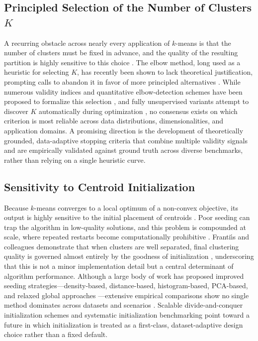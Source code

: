 \subsection{Principled Selection of the Number of Clusters $K$}
A recurring obstacle across nearly every application of $k$-means is that the number of clusters must be fixed in advance, and the quality of the resulting partition is highly sensitive to this choice \cite{yuan2019research,chong2021means,gowsic2024enhanced,ran2021novel}. The elbow method, long used as a heuristic for selecting $K$, has recently been shown to lack theoretical justification, prompting calls to abandon it in favor of more principled alternatives \cite{schubert2023stop}. While numerous validity indices and quantitative elbow-detection schemes have been proposed to formalize this selection \cite{shi2021quantitative,herdiana2026more,ashari2023analysis,syakur2018integration,saputra2020effect}, and fully unsupervised variants attempt to discover $K$ automatically during optimization \cite{sinaga2020unsupervised,yang2023unsupervised,wei2013improved,hossain2019dynamic}, no consensus exists on which criterion is most reliable across data distributions, dimensionalities, and application domains. A promising direction is the development of theoretically grounded, data-adaptive stopping criteria that combine multiple validity signals and are empirically validated against ground truth across diverse benchmarks, rather than relying on a single heuristic curve.

\subsection{Sensitivity to Centroid Initialization}
Because $k$-means converges to a local optimum of a non-convex objective, its output is highly sensitive to the initial placement of centroids \cite{vardakas2022global,tongbram2021segmentation,xiao2024comprehensive,zubair2022improved}. Poor seeding can trap the algorithm in low-quality solutions, and this problem is compounded at scale, where repeated restarts become computationally prohibitive \cite{chen2019big}. Franti{\'\i}s and colleagues demonstrate that when clusters are well separated, final clustering quality is governed almost entirely by the goodness of initialization \cite{franti2019how}, underscoring that this is not a minor implementation detail but a central determinant of algorithm performance. Although a large body of work has proposed improved seeding strategies---density-based, distance-based, histogram-based, PCA-based, and relaxed global approaches \cite{kumar2017density,aldahdooh2013dimk,bhavani2022efficient,li2018experiment,agha2012efficient,vardakas2022global}---extensive empirical comparisons show no single method dominates across datasets and scenarios \cite{harris2022extensive}. Scalable divide-and-conquer initialization schemes \cite{hamalainen2020improving} and systematic initialization benchmarking \cite{celebi2012comparative} point toward a future in which initialization is treated as a first-class, dataset-adaptive design choice rather than a fixed default.

